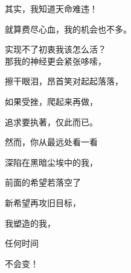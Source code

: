 {其实，我知道天命难违！ 

就算费尽心血，我的机会也不多。 

实现不了初衷我该怎么活？
\\

那我的神经更会紧张哆嗦， 

擦干眼泪，昂首笑对起起落落，

如果受挫，爬起来再做，

追求要执著，仅此而已。

然而，你从最远处看一看 

深陷在黑暗尘埃中的我，

前面的希望若落空了 

新希望再攻旧目标， 

我塑造的我， 

任何时间 

不会变！
}
